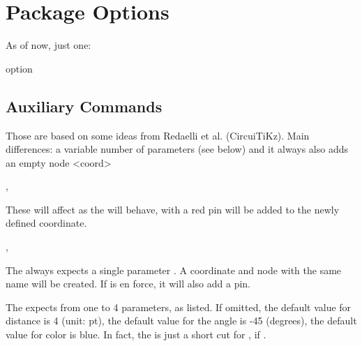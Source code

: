\documentclass[a4paper, titlepage]{article}
\begin{document}
\section{Package Options}

As of now, just one:
\begin{describelist}{option}
\end{describelist}

\subsection{Auxiliary Commands}\label{auxcmds}
Those are based on some ideas from Redaelli et al. (CircuiTiKz). Main differences: a variable number of parameters (see below) and it always also adds an empty node <coord>
\begin{codedescribe}{\showcoordstrue,\shoocoordsfalse}
\begin{codesyntax}%
\tsmacro{\showcoordstrue}{}
\tsmacro{\showcoordsfalse}{}
\end{codesyntax}
These will affect as the  \tsobj{\coord} will behave, with \tsobj{\showcoordstrue} a red pin will be added to the newly defined coordinate.
\end{codedescribe}

\begin{codedescribe}{\coord,\pincoord}
\begin{codesyntax}%
\tsobj{\coord}
\tsobj{\pincoord}\tsverb{(}\tsverb{)}
\tsobj{\pincoord}\tsverb{(}\tsverb{)}
\tsobj{\pincoord}\tsverb{(}\tsverb{)}
\tsobj{\pincoord}\tsverb{(}\tsverb{)}
\end{codesyntax}
The \tsobj{\coord} always expects a single parameter . A coordinate and node with the same name will be created. If \tsobj{\showcoordstrue} is en force, it will also add a pin.

The \tsobj{\pincoord} expects from one to 4 parameters, as listed. If omitted, the default value for distance is 4 (unit: pt), the default value for the angle is -45 (degrees), the default value for color is blue.
In fact, the  is just a short cut for , if \tsobj{\showcoordstrue}.
\end{codedescribe}
\end{document}
